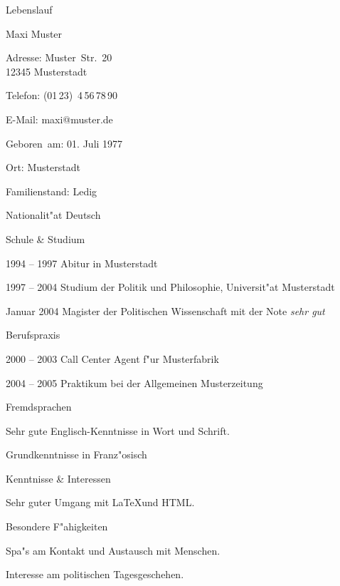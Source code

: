 \documentclass[12pt,a4paper]{scrartcl}
\begin{document}
 
\thispagestyle{empty}
 
\begin{cv}{Lebenslauf}
\vspace{0.5cm}
  \begin{cvlist}{Maxi Muster}
  \item[Adresse:] Muster~Str.~20\\12345 Musterstadt
  \item[Telefon:] (01\,23)~4\,56\,78\,90
  \item[E-Mail:] maxi@muster.de
  \item[Geboren~am:]01. Juli 1977 
  \item[Ort:] Musterstadt
  \item[Familienstand:] Ledig
  \item[Nationalit"at] Deutsch
  \end{cvlist}
 
  \begin{cvlist}{Schule \& Studium}
  \item[1994 -- 1997] Abitur in Musterstadt
  \item[1997 -- 2004] Studium der Politik und Philosophie, 
Universit"at Musterstadt
  \item[Januar 2004] Magister der Politischen Wissenschaft mit der 
Note \textit{sehr gut}
  \end{cvlist}
 
  \begin{cvlist}{Berufspraxis}
  \item[2000 -- 2003] Call Center Agent f"ur Musterfabrik
  \item[2004 -- 2005] Praktikum bei der Allgemeinen Musterzeitung
  \end{cvlist}
 
  \begin{cvlist}{Fremdsprachen}
  \item[] Sehr gute Englisch-Kenntnisse in Wort und Schrift.
  \item[] Grundkenntnisse in Franz"osisch
  \end{cvlist}
 
  \begin{cvlist}{Kenntnisse \& Interessen}
  \item[] Sehr guter Umgang mit \LaTeX und HTML.
  \end{cvlist}
 
  \begin{cvlist}{Besondere F"ahigkeiten}
  \item[] Spa"s am Kontakt und Austausch mit Menschen.
  \item[] Interesse am politischen Tagesgeschehen.
  \end{cvlist}
 
  \date{den \today}
\end{cv}
\end{document}
